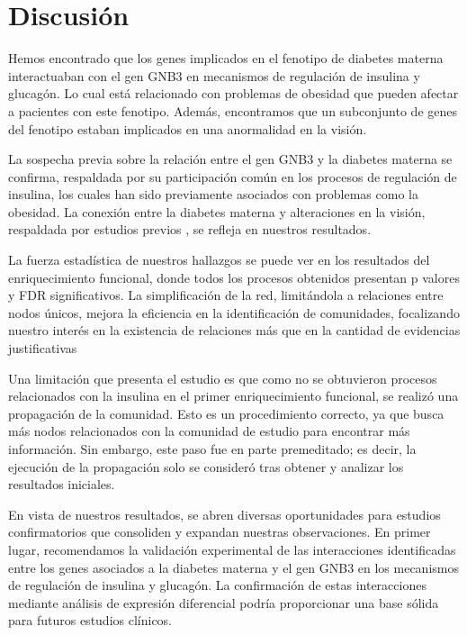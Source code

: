 \section{Discusión}
Hemos encontrado que los genes implicados en el fenotipo de diabetes materna interactuaban con el gen GNB3 en mecanismos de regulación de insulina y glucagón. Lo cual está relacionado con problemas de obesidad que pueden afectar a pacientes con este fenotipo. Además, encontramos que un subconjunto de genes del fenotipo estaban implicados en una anormalidad en la visión.

La sospecha previa sobre la relación entre el gen GNB3 y la diabetes materna se confirma, respaldada por su participación común en los procesos de regulación de insulina\cite{Rodolaki2023, Feng2019}, los cuales han sido previamente asociados con problemas como la obesidad\cite{Shah2011}. La conexión entre la diabetes materna y alteraciones en la visión, respaldada por estudios previos \cite{Nelson1986}, se refleja en nuestros resultados.

La fuerza estadística de nuestros hallazgos se puede ver en los resultados del enriquecimiento funcional, donde todos los procesos obtenidos presentan p valores y FDR significativos. La simplificación de la red, limitándola a relaciones entre nodos únicos, mejora la eficiencia en la identificación de comunidades, focalizando nuestro interés en la existencia de relaciones más que en la cantidad de evidencias justificativas

Una limitación que presenta el estudio es que como no se obtuvieron procesos relacionados con la insulina en el primer enriquecimiento funcional, se realizó una propagación de la comunidad. Esto es un procedimiento correcto, ya que busca más nodos relacionados con la comunidad de estudio para encontrar más información. Sin embargo, este paso fue en parte premeditado; es decir, la ejecución de la propagación solo se consideró tras obtener y analizar los resultados iniciales.

En vista de nuestros resultados, se abren diversas oportunidades para estudios confirmatorios que consoliden y expandan nuestras observaciones. En primer lugar, recomendamos la validación experimental de las interacciones identificadas entre los genes asociados a la diabetes materna y el gen GNB3 en los mecanismos de regulación de insulina y glucagón. La confirmación de estas interacciones mediante análisis de expresión diferencial\cite{Haynes2013} podría proporcionar una base sólida para futuros estudios clínicos.

